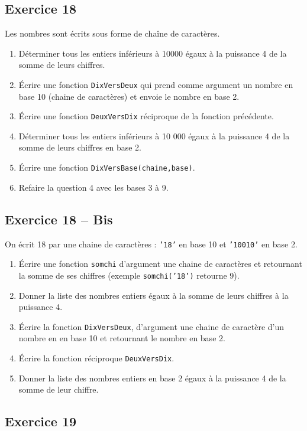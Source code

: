 \documentclass[10pt,fleqn]{article} %
\begin{document}
\begin{multicols}{2}
\subsection*{Exercice 18}
Les nombres sont écrits sous forme de chaîne de caractères.
\begin{enumerate}
\item Déterminer tous les entiers inférieurs à 10000 égaux à la puissance 4 de la somme de leurs chiffres.
\item Écrire une fonction \texttt{DixVersDeux} qui prend comme argument un nombre en base 10 (chaine de caractères) et envoie le nombre en base 2. 
\item Écrire une fonction \texttt{DeuxVersDix} réciproque de la fonction précédente. 
\item Déterminer tous les entiers inférieurs à 10 000 égaux à la puissance 4 de la somme de leurs chiffres en base 2.
\item Écrire une fonction  \texttt{DixVersBase(chaine,base)}. 
\item Refaire la question 4 avec les bases 3 à 9.
\end{enumerate}

\subsection*{Exercice 18 -- Bis}
On écrit 18 par une chaine de caractères : \texttt{'18'} en base 10 et \texttt{'10010'} en base 2. 
\begin{enumerate}
\item Écrire une fonction \texttt{somchi} d'argument une chaine de caractères et retournant la somme de ses chiffres  (exemple \texttt{somchi('18')} retourne 9).
\item Donner la liste des nombres entiers égaux à la somme de leurs chiffres à la puissance 4. 
\item Écrire la fonction \texttt{DixVersDeux}, d'argument une chaine de caractère d'un nombre en en base 10 et retournant le nombre en base 2. 
\item Écrire la fonction réciproque \texttt{DeuxVersDix}.
\item Donner la liste des nombres entiers en base 2 égaux à la puissance 4 de la somme de leur chiffre.
\end{enumerate}


\subsection*{Exercice 19}


\end{multicols}
\end{document}
